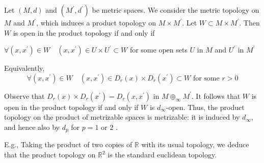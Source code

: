 \documentclass[a4paper,11pt]{article}
\begin{document}
\begin{example}
    Let $(M, d)$ and $\left(M^{\prime}, d^{\prime}\right)$ be metric spaces. We consider the metric topology on $M$ and $M^{\prime}$, which induces a product topology on $M \times M^{\prime}$. Let $W \subset M \times M^{\prime}$. Then $W$ is open in the product topology if and only if
    \begin{center}
        $\forall\left(x, x^{\prime}\right) \in W \quad\left(x, x^{\prime}\right) \in U \times U^{\prime} \subset W$ for some open sets $U$ in $M$ and $U^{\prime}$ in $M^{\prime}$
    \end{center}
    Equivalently,
    $$
    \forall\left(x, x^{\prime}\right) \in W \quad\left(x, x^{\prime}\right) \in D_{r}(x) \times D_{r}\left(x^{\prime}\right) \subset W \text { for some } r>0
    $$

    Observe that $D_{r}(x) \times D_{r}\left(x^{\prime}\right)=D_{r}\left(x, x^{\prime}\right)$ in $M \oplus_{\infty} M^{\prime}$. It follows that $W$ is open in the product topology if and only if $W$ is $d_{\infty}$-open. Thus, the product topology on the product of metrizable spaces is metrizable: it is induced by $d_{\infty}$, and hence also by $d_{p}$ for $p=1$ or 2 .

    E.g., Taking the product of two copies of $\mathbb{R}$ with its usual topology, we deduce that the product topology on $\mathbb{R}^{2}$ is the standard euclidean topology.
\end{example}
\end{document}
